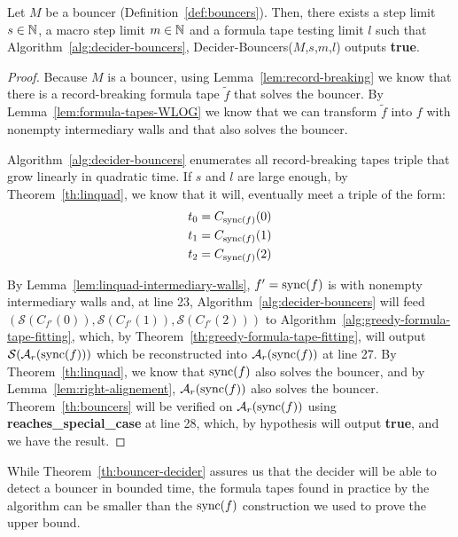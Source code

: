 \begin{theorem}\label{th:bouncer-decider}
    Let $M$ be a bouncer (Definition~\ref{def:bouncers}). Then, there exists a step limit $s\in\mathbb{N}$, a macro step limit $m\in\mathbb{N}$ and a formula tape testing limit $l$ such that Algorithm~\ref{alg:decider-bouncers}, {\sc Decider-Bouncers}($M$,$s$,$m$,$l$) outputs \textbf{true}.
\end{theorem}
\begin{proof}
    Because $M$ is a bouncer, using Lemma~\ref{lem:record-breaking} we know that there is a record-breaking formula tape $\tilde{f}$ that solves the bouncer. By Lemma~\ref{lem:formula-tapes-WLOG} we know that we can transform $\tilde{f}$ into $f$ with nonempty intermediary walls and that also solves the bouncer.

    Algorithm~\ref{alg:decider-bouncers} enumerates all record-breaking tapes triple that grow linearly in quadratic time. If $s$ and $l$ are large enough, by Theorem~\ref{th:linquad}, we know that it will, eventually meet a triple of the form: \begin{align*}
        t_0 & = C_{\operatorname{sync}(f)}(0) \\
        t_1 & = C_{\operatorname{sync}(f)}(1) \\
        t_2 & = C_{\operatorname{sync}(f)}(2)
    \end{align*}

    By Lemma~\ref{lem:linquad-intermediary-walls}, $f'=\operatorname{sync}(f)$ is with nonempty intermediary walls and, at line 23, Algorithm~\ref{alg:decider-bouncers} will feed $(\mathcal{S}(C_{f'}(0)),\mathcal{S}(C_{f'}(1)),\mathcal{S}(C_{f'}(2)))$ to Algorithm~\ref{alg:greedy-formula-tape-fitting}, which, by Theorem~\ref{th:greedy-formula-tape-fitting}, will output $\mathcal{S}(\mathcal{A}_r(\operatorname{sync}(f)))$ which be reconstructed into $\mathcal{A}_r(\operatorname{sync}(f))$ at line 27. By Theorem~\ref{th:linquad}, we know that $\operatorname{sync}(f)$ also solves the bouncer, and by Lemma~\ref{lem:right-alignement}, $\mathcal{A}_r(\operatorname{sync}(f))$ also solves the bouncer. Theorem~\ref{th:bouncers} will be verified on $\mathcal{A}_r(\operatorname{sync}(f))$ using \textbf{reaches\_special\_case} at line 28, which, by hypothesis will output \textbf{true}, and we have the result.
\end{proof}

\begin{remark}
    While Theorem~\ref{th:bouncer-decider} assures us that the decider will be able to detect a bouncer in bounded time, the formula tapes found in practice by the algorithm can be smaller than the $\operatorname{sync}(f)$ construction we used to prove the upper bound.
\end{remark}

